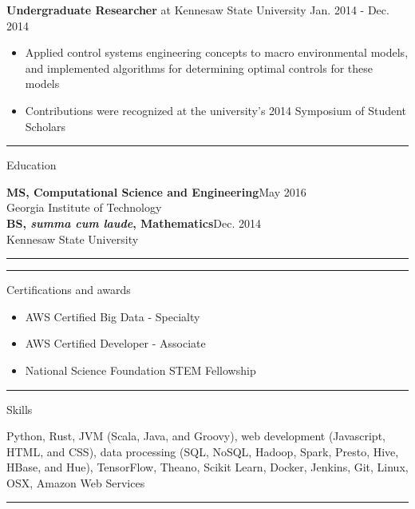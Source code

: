 \documentclass[]{article}
\def \mysection[#1]{
\vspace{.4cm}
\hrule
\vspace{.4cm}
{\large #1 \par}
\vspace{.3cm}
}
\begin{document}
\textbf{Undergraduate Researcher} at Kennesaw State University \hfill Jan. 2014 - Dec. 2014
\begin{itemize}[leftmargin=*, topsep=.5em, itemsep=.25em]
\item Applied control systems engineering concepts to macro environmental models, and implemented algorithms for determining optimal controls for these models
\item Contributions were recognized at the university's 2014 Symposium of Student Scholars
\end{itemize}

\mysection[Education]
\textbf{MS, Computational Science and Engineering}\hfill May 2016\\Georgia Institute of Technology\hspace{10pt}\\

\textbf{BS, \textit{summa cum laude}, Mathematics}\hfill Dec. 2014\\Kennesaw State University\hspace{10pt}

\vspace{.3cm}
\hrule

\pagebreak
\mysection[Certifications and awards]
\begin{itemize}[leftmargin=*, topsep=.5em, itemsep=.25em]
\item AWS Certified Big Data - Specialty
\item AWS Certified Developer - Associate
\item National Science Foundation STEM Fellowship
\end{itemize}

\mysection[Skills]
Python, Rust, JVM (Scala, Java, and Groovy), web development (Javascript, HTML, and CSS), data processing (SQL, NoSQL, Hadoop, Spark, Presto, Hive, HBase, and Hue), TensorFlow, Theano, Scikit Learn, Docker, Jenkins, Git, Linux, OSX, Amazon Web Services \\
\hrule
\end{document}
